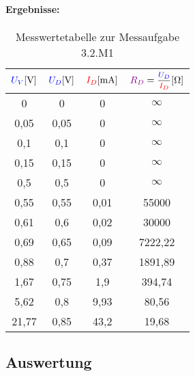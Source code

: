 \documentclass[a4paper,titlepage,parskip]{scrreprt}
\newcommand{\spannung}[1]{\textcolor{blue}{#1}}
\newcommand{\strom}[1]{\textcolor{red}{#1}}
\newcommand{\widerstand}[1]{\textcolor{violet}{#1}}
\begin{document}
              \paragraph{Ergebnisse:}
                \begin{center}
                    \begin{table}[!hbtp]
                        \caption{Messwertetabelle zur Messaufgabe 3.2.M1}
                        \label{tbl:messergebnisse3.2}
                        \renewcommand{\arraystretch}{1.3}
                        \begin{center}

                        \begin{tabular}{cccc}
                            $\spannung{U_V} [\si{\volt}]$ &
                            $\spannung{U_D}[\si{\volt}]$ &
                            $\strom{I_D} [\si{\milli\ampere}]$ &
                            $\widerstand{R_D} = \mfrac{\spannung{U_D}}{\strom{I_D}} [\si{\ohm}]$ \\ \hline

                            0 & 0 & 0 & $\infty$\\
                            0,05 & 0,05 & 0 & $\infty$\\
                            0,1 & 0,1 & 0 & $\infty$\\
                            0,15 & 0,15 & 0 & $\infty$\\
                            0,5 & 0,5 & 0 & $\infty$\\
                            0,55 & 0,55 & 0,01 & 55000\\
                            0,61 & 0,6 & 0,02 & 30000\\
                            0,69 & 0,65 & 0,09 & 7222,22\\
                            0,88 & 0,7 & 0,37 & 1891,89\\
                            1,67 & 0,75 & 1,9 & 394,74\\
                            5,62 & 0,8 & 9,93 & 80,56\\
                            21,77 & 0,85 & 43,2 & 19,68\\
                        \end{tabular}
                    \end{center}
                    \end{table}
                \end{center}
		 \pagebreak         
         \subsection{Auswertung}
\end{document}
